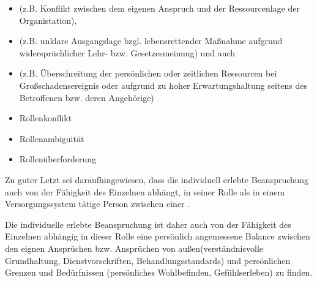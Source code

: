 {
\begin{itemize}
  Sanitätsdienst als berufliche Rolle geht mit diversen
  Anforderungen seitens der eigenen Person, der Organisation
  und nicht zuletzt der Gesellschaft einher. Demgegenüber ist
  er durch bestimmte Rahmenbedingungen wie zeitliche,
  personelle, strukturelle Ressourcen und gesetzliche
  Bestimmungen beschränkt. Daraus können Situationen
  entstehen, die zu
  \item {} (z.B. Konflikt
  zwischen dem eigenen Anspruch und der Ressourcenlage der
  Organistation),
  \item {}  (z.B. unklare
  Ausgangslage bzgl. lebensrettender Maßnahme aufgrund
  widersprüchlicher Lehr- bzw. Gesetzesmeinung) und auch
  \item
   (z.B. Überschreitung der
  persönlichen oder zeitlichen Ressourcen bei
  Großschadensereignis oder aufgrund zu hoher
  Erwartungshaltung seitens des Betroffenen bzw. deren
  Angehörige)
\end{itemize}
}
{\begin{itemize}
  \item {Rollenkonflikt}
  \item {Rollenambiguität}
  \item {Rollenüberforderung}
\end{itemize}}
{}
{}
{}



Zu guter Letzt sei daraufhingewiesen, dass die individuell
erlebte Beanspruchung auch von der Fähigkeit des Einzelnen
abhängt, in seiner Rolle als in einem Versorgungssystem 
tätige Person 
zwischen einer .

Die individuelle erlebte Beanspruchung ist daher auch von der Fähigkeit des Einzelnen abhängig in dieser Rolle eine persönlich angemessene Balance zwischen den eignen Ansprüchen bzw. Ansprüchen von außen(verständnisvolle Grundhaltung, Dienstvorschriften, Behandlungsstandards) und persönlichen Grenzen und Bedürfnissen (persönliches Wohlbefinden, Gefühlserleben) zu finden.

